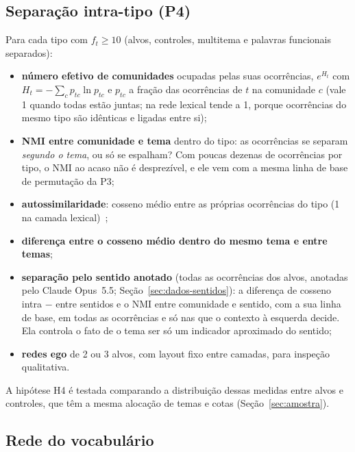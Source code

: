 \subsection{Separação intra-tipo (P4)}\label{sec:met-p4}

Para cada tipo com $f_t\ge10$ (alvos, controles, multitema e palavras funcionais separados):
\begin{itemize}
    \item \textbf{número efetivo de comunidades} ocupadas pelas suas ocorrências,
    $e^{H_t}$ com $H_t=-\sum_c p_{tc}\ln p_{tc}$ e $p_{tc}$ a fração das ocorrências de $t$
    na comunidade $c$ (vale 1 quando todas estão juntas; na rede lexical tende a 1, porque
    ocorrências do mesmo tipo são idênticas e ligadas entre si);
    \item \textbf{NMI entre comunidade e tema} dentro do tipo: as ocorrências se separam
    \emph{segundo o tema}, ou só se espalham? Com poucas dezenas de ocorrências por tipo, o
    NMI ao acaso não é desprezível, e ele vem com a mesma linha de base de permutação da P3;
    \item \textbf{autossimilaridade}: cosseno médio entre as próprias ocorrências do tipo
    (1 na camada lexical)~\cite{ethayarajh2019};
    \item \textbf{diferença entre o cosseno médio dentro do mesmo tema e entre temas};
    \item \textbf{separação pelo sentido anotado} (todas as ocorrências dos alvos, anotadas pelo
    Claude Opus~5.5; Seção~\ref{sec:dados-sentidos}): a diferença de cosseno intra $-$ entre
    sentidos e o NMI entre comunidade e sentido, com a sua linha de base, em todas as
    ocorrências e só nas que o contexto à esquerda decide. Ela controla o fato de o tema ser só
    um indicador aproximado do sentido;
    \item \textbf{redes ego} de 2 ou 3 alvos, com layout fixo entre camadas, para inspeção
    qualitativa.
\end{itemize}
A hipótese H4 é testada comparando a distribuição dessas medidas entre alvos e controles,
que têm a mesma alocação de temas e cotas (Seção~\ref{sec:amostra}).

\subsection{Rede do vocabulário}\label{sec:met-vocab}

